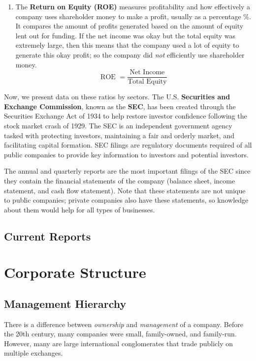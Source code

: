 \documentclass{article}
\begin{document}
\begin{enumerate}
      \item The \textbf{Return on Equity (ROE)} measures profitability and how effectively a company uses shareholder money to make a profit, usually as a percentage \%. It compares the amount of profits generated based on the amount of equity lent out for funding. If the net income was okay but the total equity was extremely large, then this means that the company used a lot of equity to generate this okay profit; so the company did \textit{not} efficiently use shareholder money.
      \begin{equation}
        \text{ROE } = \frac{\text{Net Income}}{\text{Total Equity}}
      \end{equation}
    \end{enumerate}

    Now, we present data on these ratios by sectors. The U.S. \textbf{Securities and Exchange Commission}, known as the \textbf{SEC}, has been created through the Securities Exchange Act of 1934 to help restore investor confidence following the stock market crash of 1929. The SEC is an independent government agency tasked with protecting investors, maintaining a fair and orderly market, and facilitating capital formation. SEC filings are regulatory documents required of all public companies to provide key information to investors and potential investors.

    The annual and quarterly reports are the most important filings of the SEC since they contain the financial statements of the company (balance sheet, income statement, and cash flow statement). Note that these statements are not unique to public companies; private companies also have these statements, so knowledge about them would help for all types of businesses.

  \subsection{Current Reports}

\section{Corporate Structure}

  \subsection{Management Hierarchy}

    There is a difference between \textit{ownership} and \textit{management} of a company. Before the 20th century, many companies were small, family-owned, and family-run. However, many are large international conglomerates that trade publicly on multiple exchanges. 
\end{document}
